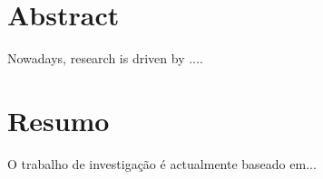 

\begingroup
\let\clearpage\relax
\let\cleardoublepage\relax
\let\cleardoublepage\relax

\chapter*{Abstract}

Nowadays, research is driven by ....

\vfill

\chapter*{Resumo}

O trabalho de investigação é actualmente baseado em...


\endgroup			

\vfill

